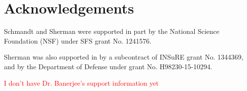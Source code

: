 \section{Acknowledgements}

Schmandt and Sherman were supported in part by the National Science Foundation (NSF) under SFS grant No. 1241576. 

Sherman was also supported in by a subcontract of INSuRE grant No. 1344369, and by the Department of Defense under grant No. H98230-15-10294.

\textcolor{red}{I don't have Dr. Banerjee's support information yet}